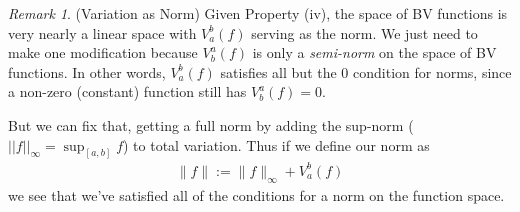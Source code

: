 \documentclass[12pt]{article}
\numberwithin{equation}{section} %
\theoremstyle{plain}
\theoremstyle{definition}
\theoremstyle{remark}
\newtheorem*{rmk}{Remark}
\begin{document}
\begin{rmk}(Variation as Norm)
Given Property (iv), the space of BV functions is very nearly a linear
space with $V_a^b(f)$ serving as the norm.
We just need to make one modification because $V^a_b(f)$ is only a
\emph{semi-norm} on the space of BV functions. In other words,
$V^b_a(f)$ satisfies  all but the 0 condition for norms, since a
non-zero (constant) function still has $V^a_b(f)=0$.

But we can fix that, getting a full norm by adding the sup-norm
($||f||_\infty = \sup_{[a,b]} f$) to total variation. Thus if we define
our norm as
\begin{align*}
  \lVert f \rVert := \lVert f\rVert_\infty + V_a^b(f)
\end{align*}
we see that we've satisfied all of the conditions for a norm on the
function space.
\end{rmk}
\end{document}
